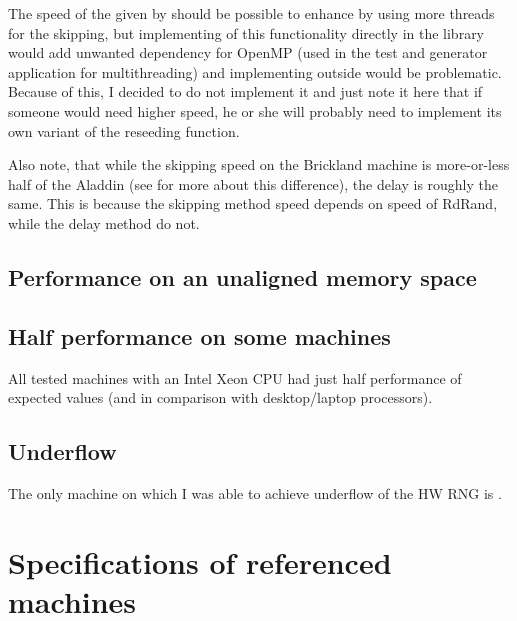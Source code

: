 The speed of the given by  should be possible to enhance by using more threads for the skipping, but implementing of this functionality directly in the library would add unwanted dependency for OpenMP (used in the test and generator application for multithreading) and implementing outside would be problematic. Because of this, I decided to do not implement it and just note it here that if someone would need higher speed, he or she will probably need to implement its own variant of the reseeding function.

Also note, that while the skipping speed on the Brickland machine is more-or-less half of the Aladdin (see  for more about this difference), the delay is roughly the same. This is because the skipping method speed depends on speed of RdRand, while the delay method do not.


\subsection{Performance on an unaligned memory space}


\subsection{Half performance on some machines}\label{subsec:testing:halfPerf}
All tested machines with an Intel Xeon CPU had just half performance of expected values (and in comparison with desktop/laptop processors).


\subsection{Underflow}
The only machine on which I was able to achieve underflow of the HW RNG is .



\section{Specifications of referenced machines}

